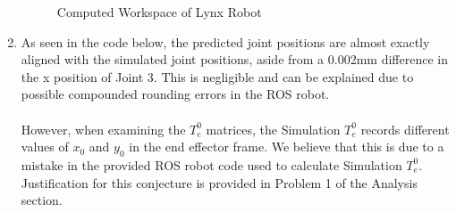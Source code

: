 \documentclass[12pt]{article}
\begin{document}
\begin{enumerate}
\begin{figure} [h]
	\caption{Computed Workspace of Lynx Robot}
	\end{figure}
\item As seen in the code below, the predicted joint positions are almost exactly aligned with the simulated joint positions, aside from a 0.002mm difference in the x position of Joint 3. This is negligible and can be explained due to possible compounded rounding errors in the ROS robot.\\ \\ However, when examining the $T^{0}_{e}$ matrices, the Simulation $T^{0}_{e}$ records different values of $x_{0}$ and $y_{0}$ in the end effector frame. We believe that this is due to a mistake in the provided ROS robot code used to calculate Simulation $T^{0}_{e}$. Justification for this conjecture is provided in Problem 1 of the Analysis section.\\




\end{enumerate}

\newpage
\end{document}
